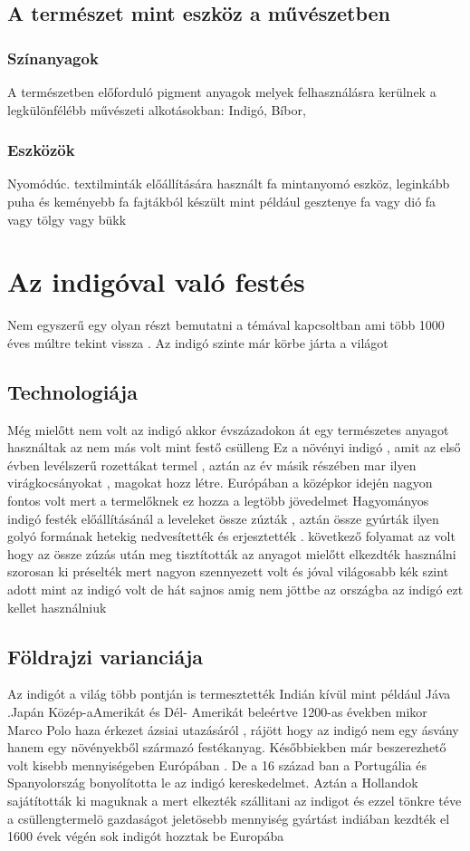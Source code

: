 \documentclass[fontsize=12pt, appendixprefix=true]{scrreprt}
\begin{document}
\section{A természet mint eszköz a művészetben}
\subsection{Színanyagok}
A természetben előforduló pigment anyagok melyek felhasználásra kerülnek a legkülönfélébb művészeti alkotásokban:
Indigó, Bíbor, 
\subsection{Eszközök}
Nyomódúc. textilminták előállítására használt fa mintanyomó eszköz, leginkább puha és keményebb fa fajtákból készült mint például gesztenye fa vagy dió fa vagy tölgy vagy bükk
\chapter{Az indigóval való festés}
Nem egyszerű egy olyan részt bemutatni a témával kapcsoltban ami több 1000 éves múltre tekint vissza .
Az indigó szinte már körbe járta a világot 

\section{Technologiája}
Még mielőtt nem volt az indigó akkor évszázadokon át egy természetes anyagot használtak az nem más volt mint festő csülleng
Ez a növényi indigó , amit az első évben levélszerű  rozettákat  termel , aztán az év másik részében mar ilyen virágkocsányokat , magokat hozz létre.
Európában  a középkor idején nagyon fontos volt mert a termelőknek ez hozza a legtöbb jövedelmet 
Hagyományos indigó festék	előállításánál a leveleket össze zúzták ,  aztán össze gyúrták ilyen golyó formának hetekig nedvesítették és erjesztették .
következő folyamat az volt hogy az össze zúzás után meg tisztították az anyagot mielőtt elkezdték használni szorosan ki préselték mert nagyon szennyezett volt és jóval világosabb kék szint adott mint az indigó volt de hát sajnos amig nem jöttbe az országba az indigó ezt kellet használniuk


\section{Földrajzi varianciája}
Az indigót a világ több pontján is termesztették  Indián kívül mint például Jáva .Japán Közép-aAmerikát és Dél- Amerikát beleértve 
1200-as években mikor Marco Polo haza érkezet ázsiai utazásáról , rájött hogy az indigó nem egy ásvány hanem egy növényekből származó festékanyag.
Későbbiekben már beszerezhető volt kisebb mennyiségeben Európában .
De a 16 század ban a Portugália és Spanyolország bonyolította le az indigó kereskedelmet.
Aztán a Hollandok sajátították ki maguknak a mert elkezték szállitani az indigot és ezzel tönkre téve a csüllengtermelö gazdaságot 
jeletösebb mennyiség gyártást indiában kezdték el 1600 évek végén sok indigót hozztak be Europába 
\end{document}
